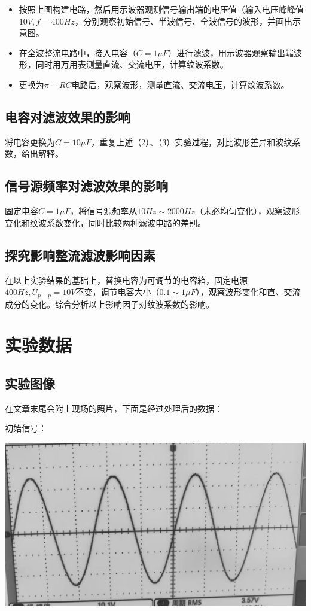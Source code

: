 \documentclass[a4paper]{ltxdoc}
\newenvironment{Figure}
{\par\medskip\noindent\minipage{\linewidth}}
{\endminipage\par\medskip}
\begin{document}
\begin{multicols}{2}
    \begin{itemize}
        \item 按照上图构建电路，然后用示波器观测信号输出端的电压值（输入电压峰峰值$10V, f=400Hz$，分别观察初始信号、半波信号、全波信号的波形，并画出示意图。
        \item 在全波整流电路中，接入电容（$C= 1\mu F$）进行滤波，用示波器观察输出端波形，同时用万用表测量直流、交流电压，计算纹波系数。
        \item 更换为$\pi-RC$电路后，观察波形，测量直流、交流电压，计算纹波系数。
    \end{itemize}

    \subsection{电容对滤波效果的影响}

    将电容更换为$C= 10\mu F$，重复上述（2）、（3）实验过程，对比波形差异和波纹系数，给出解释。

    \subsection{信号源频率对滤波效果的影响}

    固定电容$C= 1\mu F$，将信号源频率从$10Hz \sim 2000 Hz$（未必均匀变化），观察波形变化和纹波系数变化，同时比较两种滤波电路的差别。

    \subsection{探究影响整流滤波影响因素}

    在以上实验结果的基础上，替换电容为可调节的电容箱，固定电源$400Hz,U_{p-p} = 10 V$不变，调节电容大小（$0.1\sim 1\mu F$），观察波形变化和直、交流成分的变化。综合分析以上影响因子对纹波系数的影响。

    \section{实验数据}

    \subsection{实验图像}
    在文章末尾会附上现场的照片，下面是经过处理后的数据：

    初始信号：
    \begin{Figure}
        \centering
        \includegraphics[width=0.7\linewidth]{img/done_edit/22.png}
    \end{Figure}


\end{multicols}
\end{document}
